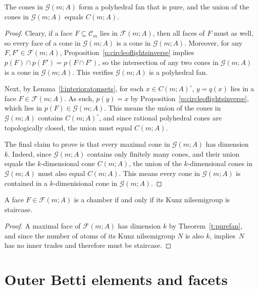 \documentclass[ALCO, Unicode]{cedram}
\newcommand\cC{{\mathcal C}}
\begin{document}
\begin{thm}\label{t:purefan}
The cones in $\mathcal G(m;A)$ form a polyhedral fan that is pure, and the union of the cones in $\mathcal G(m;A)$ equals $C(m;A)$.  
\end{thm}

\begin{proof}
Cleary, if a face $F \subseteq \cC_m$ lies in $\mathcal F(m;A)$, then all faces of $F$ must as well, so every face of a cone in $\mathcal G(m;A)$ is a cone in $\mathcal G(m;A)$.  Moreover, for any \mbox{$F, F' \in \mathcal F(m;A)$}, Proposition~\ref{p:circleoflightsinverse} implies $p(F) \cap p(F') = p(F \cap F')$, so the intersection of any two cones in $\mathcal G(m;A)$ is a cone in $\mathcal G(m;A)$.  This verifies $\mathcal G(m;A)$ is a polyhedral fan.  

Next, by Lemma~\ref{l:interioratomsets}, for each $x \in C(m;A)^\circ$, $y = q(x)$ lies in a face $F \in \mathcal F(m;A)$.   
As such, $p(y) = x$ by Proposition~\ref{p:circleoflightsinverse}, which lies in $p(F) \in \mathcal G(m;A)$.  This means the union of the cones in $\mathcal G(m;A)$ contains $C(m;A)^\circ$, and since rational polyhedral cones are topologically closed, the union must equal $C(m;A)$.  

The final claim to prove is that every maximal cone in $\mathcal G(m;A)$ has dimension $k$.  Indeed, since $\mathcal G(m;A)$ contains only finitely many cones, and their union equals the $k$-dimensional cone $C(m;A)$, the union of the $k$-dimensional cones in $\mathcal G(m;A)$ must also equal $C(m;A)$.  This means every cone in $\mathcal G(m;A)$ is contained in a $k$-dimenisional cone in $\mathcal G(m;A)$.  
\end{proof}

\begin{coro}\label{c:chamberstaircase}
A face $F \in \mathcal F(m;A)$ is a chamber if and only if its Kunz nilsemigroup is staircase.   
\end{coro}

\begin{proof}
A maximal face of $\mathcal F(m;A)$ has dimension $k$ by Theorem~\ref{t:purefan}, and since the number of atoms of its Kunz nilsemigroup $N$ is also $k$, \cite[Theorem~4.3]{kunzfaces3} implies~$N$ has no inner trades and therefore must be staircase.  
\end{proof}


\section{Outer Betti elements and facets}
\label{sec:facetouterbetti}
\end{document}
